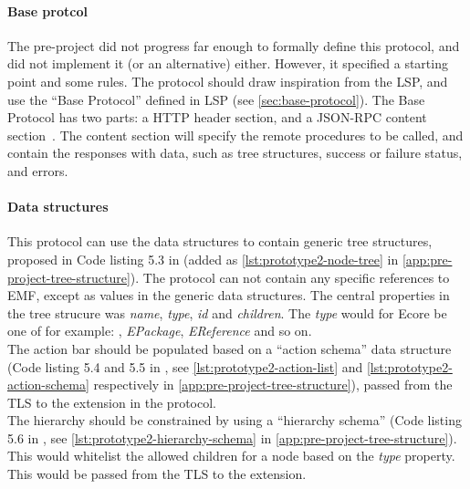\paragraph{Base protcol}
The pre-project did not progress far enough to formally define this protocol, and did not implement it (or an alternative) either.
However, it specified a starting point and some rules.
The protocol should draw inspiration from the \acrlong{LSP}, and use the ``Base Protocol'' defined in \acrshort{LSP} (see \cref{sec:base-protocol}).
The Base Protocol has two parts: a HTTP header section, and a \gls{JSON-RPC} content section~\cite[p.~17,18]{rekstadModelingEnvironmentCloud2020}.
The content section will specify the remote procedures to be called, and contain the responses with data, such as tree structures, success or failure status, and errors.


\paragraph{Data structures}
This protocol can use the data structures to contain generic tree structures, proposed in Code listing 5.3 in \cite[p.~43,44]{rekstadModelingEnvironmentCloud2020} (added as \cref{lst:prototype2-node-tree} in \cref{app:pre-project-tree-structure}).
The protocol can not contain any specific references to \acrshort{EMF}, except as values in the generic data structures.
The central properties in the tree strucure was \textit{name}, \textit{type}, \textit{id} and \textit{children}.
The \textit{type} would for \gls{Ecore} be one of for example: , \textit{EPackage}, \textit{EReference} and so on.\\

The action bar should be populated based on a ``action schema'' data structure (Code listing 5.4 and 5.5 in \cite[p.~45]{rekstadModelingEnvironmentCloud2020}, see \cref{lst:prototype2-action-list} and \cref{lst:prototype2-action-schema} respectively in \cref{app:pre-project-tree-structure}), passed from the TLS to the extension in the protocol.\\

The hierarchy should be constrained by using a ``hierarchy schema'' (Code listing 5.6 in \cite[p.~45]{rekstadModelingEnvironmentCloud2020}, see \cref{lst:prototype2-hierarchy-schema} in \cref{app:pre-project-tree-structure}).
This would whitelist the allowed children for a node based on the \textit{type} property.
This would be passed from the TLS to the extension.
